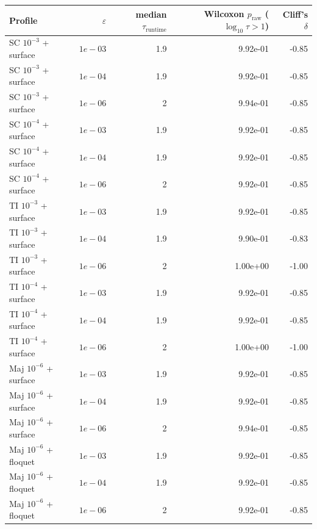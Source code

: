\begin{tabular}{lrrrr}
\toprule
Profile & $\varepsilon$ & median $\tau_{\text{runtime}}$ & Wilcoxon $p_{\text{raw}}$ ($\log_{10}\tau>1$) & Cliff's $\delta$ \\
\midrule
SC $10^{-3}$ + surface & $1e-03$ & 1.9 & 9.92e-01 & -0.85 \\
SC $10^{-3}$ + surface & $1e-04$ & 1.9 & 9.92e-01 & -0.85 \\
SC $10^{-3}$ + surface & $1e-06$ & 2 & 9.94e-01 & -0.85 \\
SC $10^{-4}$ + surface & $1e-03$ & 1.9 & 9.92e-01 & -0.85 \\
SC $10^{-4}$ + surface & $1e-04$ & 1.9 & 9.92e-01 & -0.85 \\
SC $10^{-4}$ + surface & $1e-06$ & 2 & 9.92e-01 & -0.85 \\
TI $10^{-3}$ + surface & $1e-03$ & 1.9 & 9.92e-01 & -0.85 \\
TI $10^{-3}$ + surface & $1e-04$ & 1.9 & 9.90e-01 & -0.83 \\
TI $10^{-3}$ + surface & $1e-06$ & 2 & 1.00e+00 & -1.00 \\
TI $10^{-4}$ + surface & $1e-03$ & 1.9 & 9.92e-01 & -0.85 \\
TI $10^{-4}$ + surface & $1e-04$ & 1.9 & 9.92e-01 & -0.85 \\
TI $10^{-4}$ + surface & $1e-06$ & 2 & 1.00e+00 & -1.00 \\
Maj $10^{-6}$ + surface & $1e-03$ & 1.9 & 9.92e-01 & -0.85 \\
Maj $10^{-6}$ + surface & $1e-04$ & 1.9 & 9.92e-01 & -0.85 \\
Maj $10^{-6}$ + surface & $1e-06$ & 2 & 9.94e-01 & -0.85 \\
Maj $10^{-6}$ + floquet & $1e-03$ & 1.9 & 9.92e-01 & -0.85 \\
Maj $10^{-6}$ + floquet & $1e-04$ & 1.9 & 9.92e-01 & -0.85 \\
Maj $10^{-6}$ + floquet & $1e-06$ & 2 & 9.92e-01 & -0.85 \\
\bottomrule
\end{tabular}
